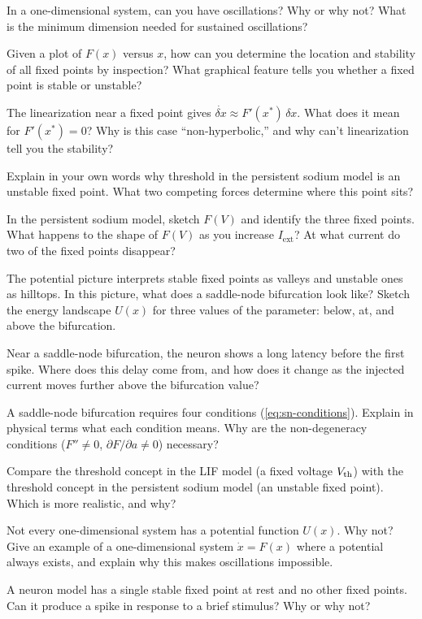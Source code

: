 \begin{conceptquestions}
  \item In a one-dimensional system, can you have oscillations? Why or why not? What is the minimum dimension needed for sustained oscillations?

  \item Given a plot of $F(x)$ versus $x$, how can you determine the location and stability of all fixed points by inspection? What graphical feature tells you whether a fixed point is stable or unstable?

  \item The linearization near a fixed point gives $\dot{\delta x} \approx F'(x^*)\,\delta x$. What does it mean for $F'(x^*) = 0$? Why is this case ``non-hyperbolic,'' and why can't linearization tell you the stability?

  \item Explain in your own words why threshold in the persistent sodium model is an unstable fixed point. What two competing forces determine where this point sits?

  \item In the persistent sodium model, sketch $F(V)$ and identify the three fixed points. What happens to the shape of $F(V)$ as you increase $I_{\text{ext}}$? At what current do two of the fixed points disappear?

  \item The potential picture interprets stable fixed points as valleys and unstable ones as hilltops. In this picture, what does a saddle-node bifurcation look like? Sketch the energy landscape $U(x)$ for three values of the parameter: below, at, and above the bifurcation.

  \item Near a saddle-node bifurcation, the neuron shows a long latency before the first spike. Where does this delay come from, and how does it change as the injected current moves further above the bifurcation value?

  \item A saddle-node bifurcation requires four conditions (\cref{eq:sn-conditions}). Explain in physical terms what each condition means. Why are the non-degeneracy conditions ($F'' \neq 0$, $\partial F/\partial a \neq 0$) necessary?

  \item Compare the threshold concept in the LIF model (a fixed voltage $V_{\text{th}}$) with the threshold concept in the persistent sodium model (an unstable fixed point). Which is more realistic, and why?

  \item Not every one-dimensional system has a potential function $U(x)$. Why not? Give an example of a one-dimensional system $\dot{x} = F(x)$ where a potential always exists, and explain why this makes oscillations impossible.

  \item A neuron model has a single stable fixed point at rest and no other fixed points. Can it produce a spike in response to a brief stimulus? Why or why not?
\end{conceptquestions}
